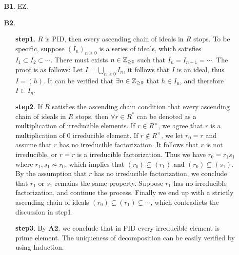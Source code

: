 \begin{enumerate}
    \item[\textbf{B1}.] EZ.
    \item[\textbf{B2}.]
    \begin{enumerate}
        \item[\textbf{step1}.] $R$ is PID, then every ascending chain of ideals in $R$ stops. To be specific, suppose $(I_n)_{n \geq 0}$ is a series of ideals, which satisfies $I_1 \subset I_2 \subset \cdots$. There must exists $n \in \mathbb Z_{\geq 0}$ such that $I_n = I_{n+1} = \cdots$. The proof is as follows: Let $I = \bigcup_{n \geq 0} I_n$, it follows that $I$ is an ideal, thus $I = (h)$. It can be verified that $\exists n \in \mathbb Z_{\geq 0}$ that $h \in I_n$, and therefore $I \subset I_n$.
        \item[\textbf{step2}.] If $R$ satisfies the ascending chain condition that every ascending chain of ideals in $R$ stops, then $\forall r \in R^*$ can be denoted as a multiplication of irreducible elements. If $r \in R^{\times}$, we agree that $r$ is a multiplication of 0 irreducible element. If $r \notin R^{\times}$, we let $r_0 = r$ and assume that $r$ has no irreducible factorization. It follows that $r$ is not irreducible, or $r = r$ is a irreducible factorization. Thus we have $r_0 = r_1 s_1$ where $r_1, s_1 \nsim r_0$, which implies that $(r_0) \subsetneq (r_1)$ and $(r_0) \subsetneq (s_1)$. By the assumption that $r$ has no irreducible factorization, we conclude that $r_1$ or $s_1$ remains the same property. Suppose $r_1$ has no irreducible factorization, and continue the process. Finally we end up with a strictly ascending chain of ideals $(r_0) \subsetneq (r_1) \subsetneq \cdots $, which contradicts the discussion in step1.
        \item[\textbf{step3}.] By \textbf{A2}. we conclude that in PID every irreducible element is prime element. The uniqueness of decomposition can be easily verified by using Induction.
    \end{enumerate}


\end{enumerate}
